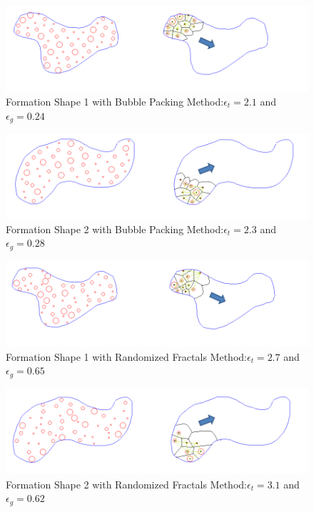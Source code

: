 \documentclass[twoside]{article}
\begin{document}
				\begin{figure}[H]
					\caption{Formation Shape 1 with Bubble Packing Method:$\epsilon_t = 2.1$ and $\epsilon_g = 0.24$}
					\centerline{\includegraphics[scale = 0.70]{Bubble_Packing_Mesh_1}}
				\end{figure} 	
						\begin{figure}[H]
							\caption{Formation Shape 2 with Bubble Packing Method:$\epsilon_t = 2.3$ and $\epsilon_g = 0.28$}
							\centerline{\includegraphics[scale = 0.65]{Bubble_Packing_Mesh_2}}
						\end{figure} 			
						\begin{figure}[H]
							\caption{Formation Shape 1 with Randomized Fractals Method:$\epsilon_t = 2.7$ and $\epsilon_g = 0.65$}
							\centerline{\includegraphics[scale = 0.70]{Randomized_Fractals_Mesh_1}}
						\end{figure} 	
						\begin{figure}[H]
							\caption{Formation Shape 2 with Randomized Fractals Method:$\epsilon_t = 3.1$ and $\epsilon_g = 0.62$}
							\centerline{\includegraphics[scale = 0.65]{Randomized_Fractals_Mesh_2}}
						\end{figure} 	
\end{document}
